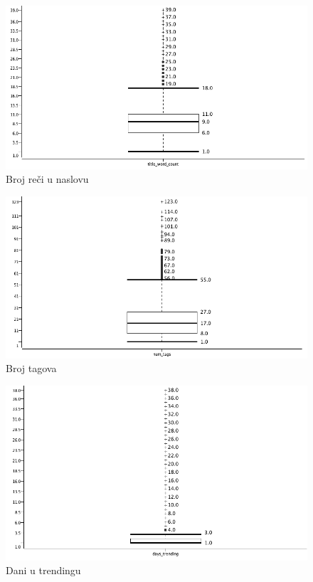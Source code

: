 \documentclass[a4paper]{article}
\theoremstyle{definition}
\begin{document}
\begin{figure}[h!]
\begin{center}
    \includegraphics[width=1\textwidth]{box_title_word_count.png}
    \caption{Broj reči u naslovu}
\end{center}
\end{figure}

\begin{figure}[h!]
\begin{center}
    \includegraphics[width=1\textwidth]{box_num-tag.png}
    \caption{Broj tagova}
\end{center}
\end{figure}

\begin{figure}[h!]
\begin{center}
    \includegraphics[width=1\textwidth]{box_trending.png}
    \caption{Dani u trendingu}
\end{center}
\end{figure}
\end{document}
